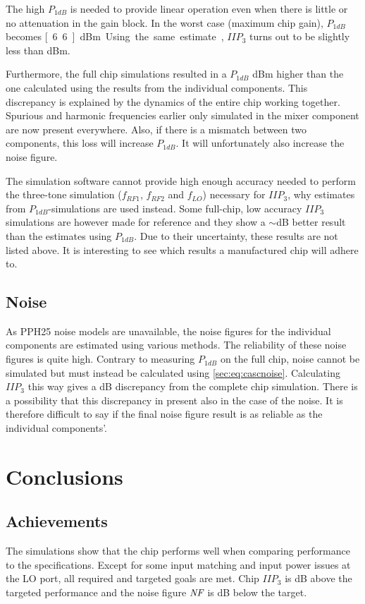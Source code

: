 			The high $P_{1dB}$ is needed to provide linear operation even when there is little or no attenuation in the gain block. In the worst case (maximum chip gain), $P_{1dB}$ becomes \unit[6.6]{dBm}. Using the same estimate, $IIP_3$ turns out to be slightly less than \unit[17]{dBm}.
			
			Furthermore, the full chip simulations resulted in a $P_{1dB}$ \unit[2]{dBm} higher than the one calculated using the results from the individual components. This discrepancy is explained by the dynamics of the entire chip working together. Spurious and harmonic frequencies earlier only simulated in the mixer component are now present everywhere. Also, if there is a mismatch between two components, this loss will increase $P_{1dB}$. It will unfortunately also increase the noise figure.
			
			The simulation software cannot provide high enough accuracy needed to perform the three-tone simulation ($f_{RF1}$, $f_{RF2}$ and $f_{LO}$) necessary for $IIP_3$, why estimates from $P_{1dB}$-simulations are used instead. Some full-chip, low accuracy $IIP_3$ simulations are however made for reference and they show a $\sim$\unit[3]{dB} better result than the estimates using $P_{1dB}$. Due to their uncertainty, these results are not listed above. It is interesting to see which results a manufactured chip will adhere to.
			
		\subsection{Noise}
			As PPH25 noise models are unavailable, the noise figures for the individual components are estimated using various methods. The reliability of these noise figures is quite high. Contrary to measuring $P_{1dB}$ on the full chip, noise cannot be simulated but must instead be calculated using \autoref{sec:eq:cascnoise}. Calculating $IIP_3$ this way gives a \unit[2]{dB} discrepancy from the complete chip simulation. There is a possibility that this discrepancy in present also in the case of the noise. It is therefore difficult to say if the final noise figure result is as reliable as the individual components'.
			
	\section{Conclusions}
		\subsection{Achievements}
			The simulations show that the chip performs well when comparing performance to the specifications. Except for some input matching and input power issues at the LO port, all required and targeted goals are met. Chip $IIP_3$ is \unit[3]{dB} above the targeted performance and the noise figure $\emph{NF}$ is \unit[1]{dB} below the target.
						
